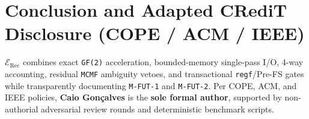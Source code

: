 \documentclass[10pt,twocolumn]{article}
\begin{document}
\section{Conclusion and Adapted CRediT Disclosure (COPE / ACM / IEEE)}

$\mathcal{E}_{\mathrm{Rec}}$ combines exact \texttt{GF(2)} acceleration, bounded-memory single-pass I/O, 4-way accounting, residual \texttt{MCMF} ambiguity vetoes, and transactional \texttt{regf}/Pre-FS gates while transparently documenting \texttt{M-FUT-1} and \texttt{M-FUT-2}. Per COPE, ACM, and IEEE policies, \textbf{Caio Gon\c{c}alves} is the \textbf{sole formal author}, supported by non-authorial adversarial review rounds and deterministic benchmark scripts.



\end{document}
